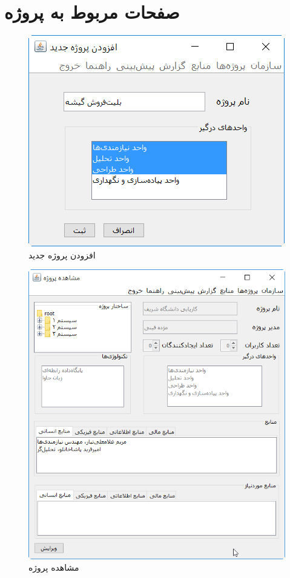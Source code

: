 \section{صفحات مربوط به پروژه}
\begin{figure}[H]
	\centering
	\includegraphics[scale=0.8]{img/prot/AddProject}
	\caption{افزودن پروژه جدید}
\end{figure}
\begin{figure}[H]
	\centering
	\includegraphics[scale=0.8]{img/prot/ViewProject}
	\caption{مشاهده پروژه }
\end{figure}
